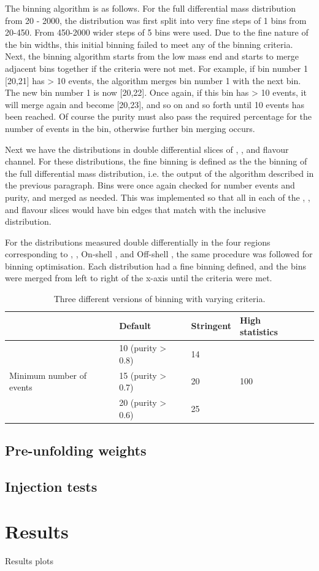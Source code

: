 The binning algorithm is as follows. For the full \mFourL differential mass distribution from \unit{20}{\Gev} - \unit{2000}{\GeV}, the distribution was first split into very fine steps of \unit{1}{\GeV} bins from \unit{20}{\Gev}-\unit{450}{\GeV}. From \unit{450}{\Gev}-\unit{2000}{\GeV} wider steps of \unit{5}{\GeV} bins were used. Due to the fine nature of the bin widths, this initial binning failed to meet any of the binning criteria. Next, the binning algorithm starts from the low mass end and starts to merge adjacent bins together if the criteria were not met. For example, if bin number 1 [20,21] has > 10 events, the algorithm merges bin number 1 with the next bin. The new bin number 1 is now [20,22]. Once again, if this bin has > 10 events, it will merge again and become [20,23], and so on and so forth until 10 events has been reached. Of course the purity must also pass the required percentage for the number of events in the bin, otherwise further bin merging occurs.  

Next we have the \mFourL distributions in double differential slices of \ptFourL, \yFourL, and flavour channel. For these distributions, the fine binning is defined as the the binning of the full \mFourL differential mass distribution, i.e. the output of the algorithm described in the previous paragraph. Bins were once again checked for number events and purity, and merged as needed. This was implemented so that all \mFourL in each of the  \ptFourL, \yFourL, and flavour slices would have bin edges that match with the inclusive distribution. 

For the distributions measured double differentially in the four \mFourL regions corresponding to \Z, \Higgs, On-shell \ZZ, and Off-shell \ZZ, the same procedure was followed for binning optimisation. Each distribution had a fine binning defined, and the bins were merged from left to right of the x-axis until the criteria were met. 

\begin{table}[bp]
  \begin{tabular}{lllll}
                & Default              & Stringent              & High statistics             \\
    \midrule
                                & 10 (purity > 0.8)   & 14 &   \\
     Minimum number of events & 15 (purity > 0.7) & 20 & 100    \\
                                &20 (purity > 0.6) & 25 &    \\
  \end{tabular}
  \caption{Three different versions of binning with varying criteria.}
  \label{tab:BinningVersions}
\end{table}

\subsection{Pre-unfolding weights}
\label{subsec:preuf}

\subsection{Injection tests}
\label{subsec:injection}



\section{Results}
\label{sec:results}

Results plots